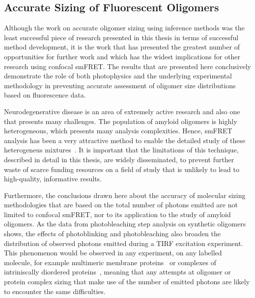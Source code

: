 \subsection{Accurate Sizing of Fluorescent Oligomers}
Although the work on accurate oligomer sizing using inference methods was the least successful piece of research presented in this thesis in terms of successful method development, it is the work that has presented the greatest number of opportunities for further work and which has the widest implications for other research using confocal smFRET. The results that are presented here conclusively demonstrate the role of both photophysics and the underlying experimental methodology in preventing accurate assessment of oligomer size distributions based on fluorescence data.

Neurodegenerative disease is an area of extremely active research and also one that presents many challenges. The population of amyloid oligomers is highly heterogeneous, which presents many analysis complexities. Hence, smFRET analysis has been a very attractive method to enable the detailed study of these heterogeneus mixtures~\cite{cremades2012}. It is important that the limitations of this technique, described in detail in this thesis, are widely disseminated, to prevent further waste of scarce funding resources on a field of study that is unlikely to lead to high-quality, informative results.

Furthermore, the conclusions drawn here about the accuracy of molecular sizing methodologies that are based on the total number of photons emitted are not limited to confocal smFRET, nor to its application to the study of amyloid oligomers. As the data from photobleaching step analysis on synthetic oligomers shows, the effects of photoblinking and photobleaching also broaden the distribution of observed photons emitted during a TIRF excitation experiment. This phenomenon would be observed in any experiment, on any labelled molecule, for example multimeric membrane proteins~\cite{Fricke2015} or complexes of intriniscally diordered proteins~\cite{Lee2015}, meaning that any attempts at oligomer or protein complex sizing that make use of the number of emitted photons are likely to encounter the same difficulties.

